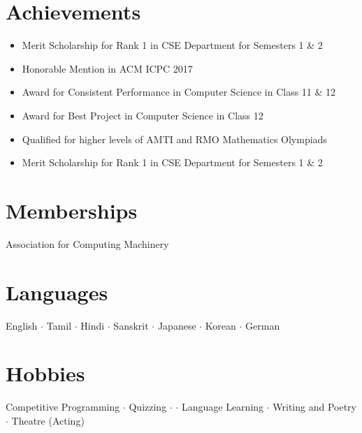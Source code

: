 \documentclass[letterpaper,11pt]{article}
\begin{document}
\section{Achievements}
\begin{itemize}[leftmargin=*]
\item Merit Scholarship for Rank 1 in CSE Department for Semesters 1 \& 2
\item Honorable Mention in ACM ICPC 2017
\item Award for Consistent Performance in Computer Science in Class 11 \& 12
\item Award for Best Project in Computer Science in Class 12
\item Qualified for higher levels of AMTI and RMO Mathematics Olympiads
\item Merit Scholarship for Rank 1 in CSE Department for Semesters 1 \& 2
\end{itemize}


\section{Memberships}
Association for Computing Machinery


\section{Languages}
English $\cdot$ Tamil $\cdot$ Hindi $\cdot$ Sanskrit $\cdot$ Japanese $\cdot$ Korean $\cdot$ German


\section{Hobbies}
Competitive Programming $\cdot$ Quizzing $\cdot$ $\cdot$ Language Learning $\cdot$ Writing and Poetry $\cdot$ Theatre (Acting)


\end{document}

